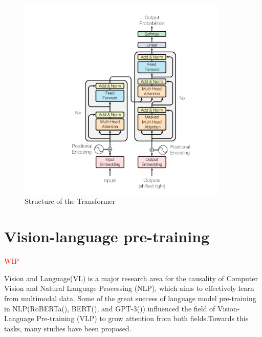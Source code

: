 \begin{figure}[htbp]
    \begin{center}
        \includegraphics[width=10cm]{img/transformer.png}
        \caption{Structure of the Transformer}\label{fig:transformer}
    \end{center}
\end{figure}




\section{Vision-language pre-training}
\textcolor{red}{WIP}

Vision and Language(VL) is a major research area for the causality of Computer Vision and Natural Language Processing (NLP), which aims to effectively learn from multimodal data. Some of the great success of language model pre-training in NLP(RoBERTa(\cite{liu2020roberta}), BERT(\cite{devlin2018bert}), and GPT-3(\cite{brown2020language})) influenced the field of Vision-Language Pre-training (VLP) to grow attention from both fields.Towards this tasks, many studies have been proposed.

